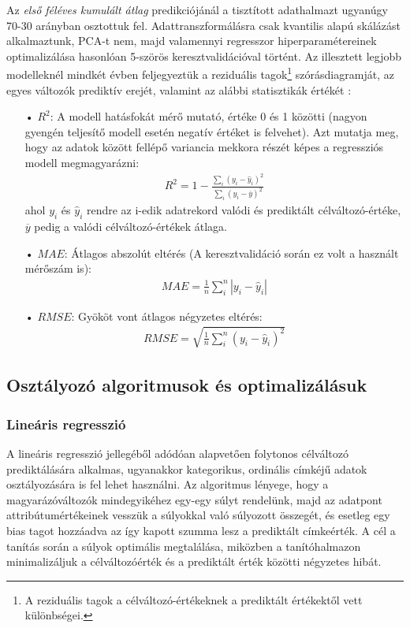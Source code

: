 \documentclass[12pt]{article}
\begin{document}
Az \textit{első féléves kumulált átlag} predikciójánál a tisztított adathalmazt ugyanúgy 70-30 arányban osztottuk fel. Adattranszformálásra csak kvantilis alapú skálázást alkalmaztunk, PCA-t nem, majd valamennyi regresszor hiperparamétereinek optimalizálása hasonlóan 5-szörös keresztvalidációval történt. Az illesztett legjobb modelleknél mindkét évben feljegyeztük a reziduális tagok\footnote{A reziduális tagok a célváltozó-értékeknek a prediktált értékektől vett különbségei.} szórásdiagramját, az egyes változók prediktív erejét, valamint az alábbi statisztikák értékét \cite{bolla_stat}:
\begin{itemize}
\item[•] $R^2$: A modell hatásfokát mérő mutató, értéke 0 és 1 közötti (nagyon gyengén teljesítő modell esetén negatív értéket is felvehet). Azt mutatja meg, hogy az adatok között fellépő variancia mekkora részét képes a regressziós modell megmagyarázni:
\begin{align}
R^2 = 1 - \frac{\sum_i (y_i - \hat{y}_i)^2}{\sum_i (y_i - \overline{y})^2}
\end{align} 
ahol $y_i$ és $\hat{y}_i$ rendre az i-edik adatrekord valódi és prediktált célváltozó-értéke, $\overline{y}$ pedig a valódi célváltozó-értékek átlaga.
\item[•] $MAE$: Átlagos abszolút eltérés (A keresztvalidáció során ez volt a használt mérőszám is):
\begin{align}
MAE = \frac{1}{n}\sum_i^n |y_i -\hat{y}_i| 
\end{align}
\item[•] $RMSE$: Gyököt vont átlagos négyzetes eltérés:
\begin{align}
RMSE = \sqrt{\frac{1}{n}\sum_i^n (y_i - \hat{y}_i)^2}
\end{align}
\end{itemize}






\subsection{Osztályozó algoritmusok és optimalizálásuk}

\subsubsection{Lineáris regresszió}

A lineáris regresszió jellegéből adódóan alapvetően folytonos célváltozó prediktálására alkalmas, ugyanakkor kategorikus, ordinális címkéjű adatok osztályozására is fel lehet használni. Az algoritmus lényege, hogy a magyarázóváltozók mindegyikéhez egy-egy súlyt rendelünk, majd az adatpont attribútumértékeinek vesszük a súlyokkal való súlyozott összegét, és esetleg egy bias tagot hozzáadva az így kapott szumma lesz a prediktált címkeérték. A cél a tanítás során a súlyok optimális megtalálása, miközben a tanítóhalmazon minimalizáljuk a célváltozóérték és a prediktált érték közötti négyzetes hibát.
\end{document}

